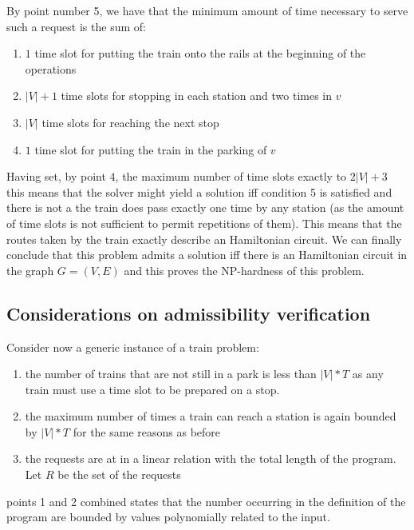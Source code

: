 \documentclass[12pt]{article}
\begin{document}
By point number 5, we have that the minimum amount of time necessary to serve such a request is the sum of:
\begin{enumerate}
\item $1$ time slot for putting the train onto the rails at the beginning of the operations
\item $|V|+1$ time slots for stopping in each station and two times in $v$
\item $|V|$ time slots for reaching the next stop 
\item $1$ time slot for putting the train in the parking of $v$
\end{enumerate}
Having set, by point 4, the maximum number of time slots exactly to $2|V|+3$ this means that the solver might yield a solution iff condition 5 is satisfied and there is not a the train does pass exactly one time by any station (as the amount of time slots is not sufficient to permit repetitions of them). This means that the routes taken by the train exactly describe an Hamiltonian circuit.
We can finally conclude that this problem admits a solution iff there is an Hamiltonian circuit in the graph $G=(V,E)$ and this proves the NP-hardness of this problem.

\subsection{Considerations on admissibility verification }

Consider now a generic instance of a train problem:

\begin{enumerate}
\item the number of trains that are not still in a park is less than $|V|*T$ as any train must use a time slot to be prepared on a stop.
\item the maximum number of times a train can reach a station is again bounded by $|V|*T$ for the same reasons as before
\item the requests are at in a linear relation with the total length of the program. Let $R$ be the set of the requests  
\end{enumerate}

points 1 and 2 combined states that the number occurring in the definition of the program are bounded by values polynomially related to the input. 
\end{document}
